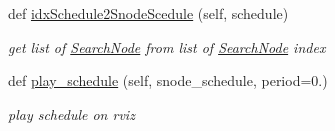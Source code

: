 \begin{DoxyCompactItemize}
def \hyperlink{classrnb-planning_1_1src_1_1pkg_1_1planning_1_1pipeline_1_1_planning_pipeline_a8b952b1e3a81557e160de1c63bdd4c6e}{idx\+Schedule2\+Snode\+Scedule} (self, schedule)
\begin{DoxyCompactList}\small\item\em get list of \hyperlink{classrnb-planning_1_1src_1_1pkg_1_1planning_1_1pipeline_1_1_search_node}{Search\+Node} from list of \hyperlink{classrnb-planning_1_1src_1_1pkg_1_1planning_1_1pipeline_1_1_search_node}{Search\+Node} index \end{DoxyCompactList}\item 
def \hyperlink{classrnb-planning_1_1src_1_1pkg_1_1planning_1_1pipeline_1_1_planning_pipeline_a4e429a2c0b8fb38fa85fc1fdeef8be7c}{play\+\_\+schedule} (self, snode\+\_\+schedule, period=0.)
\begin{DoxyCompactList}\small\item\em play schedule on rviz \end{DoxyCompactList}\end{DoxyCompactItemize}

